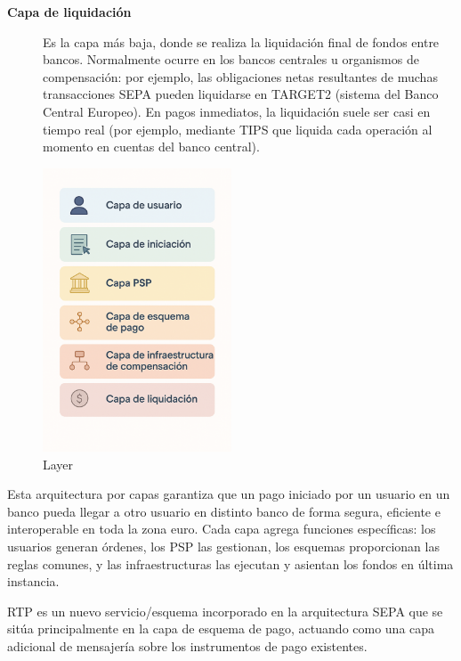 \begin{description}
  \item[\textbf{Capa de liquidación}] 
    Es la capa más baja, donde se realiza la liquidación final de fondos entre bancos. Normalmente ocurre en los bancos centrales u organismos de compensación: por ejemplo, las obligaciones netas resultantes de muchas transacciones SEPA pueden liquidarse en TARGET2 (sistema del Banco Central Europeo). En pagos inmediatos, la liquidación suele ser casi en tiempo real (por ejemplo, mediante TIPS que liquida cada operación al momento en cuentas del banco central).
\end{description}

\begin{figure}[H]
  \centering
  \includegraphics[width=0.5\textwidth]{Imagenes/esq1.png}
  \caption{Layer}
  \label{fig:Esquema por capas}
\end{figure}

Esta arquitectura por capas garantiza que un pago iniciado por un usuario en un banco pueda llegar a otro usuario en distinto banco de forma segura, eficiente e interoperable en toda la zona euro. Cada capa agrega funciones específicas: los usuarios generan órdenes, los PSP las gestionan, los esquemas proporcionan las reglas comunes, y las infraestructuras las ejecutan y asientan los fondos en última instancia.

RTP es un nuevo servicio/esquema incorporado en la arquitectura SEPA que se sitúa principalmente en la capa de esquema de pago, actuando como una capa adicional de mensajería sobre los instrumentos de pago existentes.

